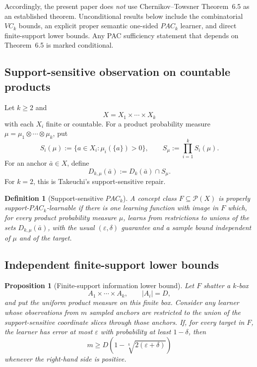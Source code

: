 \documentclass[11pt]{article}
\newtheorem{proposition}[theorem]{Proposition}
\newtheorem{definition}[theorem]{Definition}
\newcommand{\eps}{\varepsilon}
\begin{document}
Accordingly, the present paper does \emph{not} use Chernikov--Towsner
Theorem~6.5 as an established theorem.  Unconditional results below include the combinatorial \(VC_k\) bounds,
an explicit proper semantic one-sided \(PAC_k\) learner, and direct finite-support
lower bounds.  Any PAC sufficiency statement that depends on Theorem~6.5 is marked
conditional.

\subsection{Support-sensitive observation on countable products}

Let \(k\ge2\) and
\[
 X=X_1\times\cdots\times X_k
\]
with each \(X_i\) finite or countable.  For a product probability measure
\(\mu=\mu_1\otimes\cdots\otimes\mu_k\), put
\[
 S_i(\mu):=\{a\in X_i:\mu_i(\{a\})>0\},
 \qquad
 S_\mu:=\prod_{i=1}^k S_i(\mu).
\]
For an anchor \(\bar a\in X\), define
\[
 D_{k,\mu}(\bar a):=D_k(\bar a)\cap S_\mu.
\]
For \(k=2\), this is Takeuchi's support-sensitive repair.

\begin{definition}[Support-sensitive \(PAC_k\)]
\label{def:support-pac}
A concept class \(F\subseteq\mathcal P(X)\) is
\emph{properly support-\(PAC_k\)-learnable} if there is one learning function
with image in \(F\) which, for every product probability measure \(\mu\),
learns from restrictions to unions of the sets \(D_{k,\mu}(\bar a)\), with
the usual \((\eps,\delta)\) guarantee and a sample bound independent of
\(\mu\) and of the target.
\end{definition}





\subsection{Independent finite-support lower bounds}

\begin{proposition}[Finite-support information lower bound]
\label{prop:finite-support-lower}
Let \(F\) shatter a \(k\)-box
\[
 A_1\times\cdots\times A_k,\qquad |A_i|=D,
\]
and put the uniform product measure on this finite box.  Consider any learner
whose observations from \(m\) sampled anchors are restricted to the union of
the support-sensitive coordinate slices through those anchors.  If, for every
target in \(F\), the learner has error at most \(\eps\) with probability at
least \(1-\delta\), then
\[
 m\ge
 D\left(1-\sqrt[k]{2(\eps+\delta)}\right)
\]
whenever the right-hand side is positive.
\end{proposition}
\end{document}

